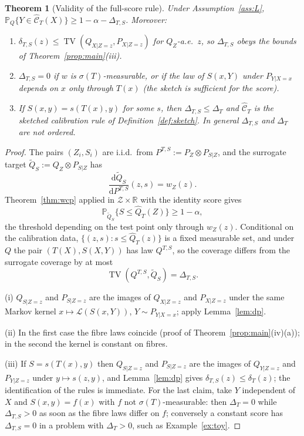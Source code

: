 \documentclass[11pt,a4paper]{article}
\newcommand{\Prob}{\mathbb{P}}
\newcommand{\R}{\mathbb{R}}
\newcommand{\TV}{\operatorname{TV}}
\newcommand{\Cset}{\widehat{\mathcal C}}
\newcommand{\Zc}{\mathcal Z}
\newcommand{\Qt}{\widetilde Q}
\theoremstyle{plain}
\newtheorem{theorem}{Theorem}[section]
\theoremstyle{definition}
\theoremstyle{remark}
\begin{document}
\begin{theorem}[Validity of the full-score rule]\label{thm:fullscore}
Under Assumption~\ref{ass:L}, $\Prob_Q\{Y\in\Cset_T(X)\}\ge1-\alpha-\Delta_{T,S}$. Moreover:
\begin{enumerate}[leftmargin=1.8em,itemsep=1pt]
\item[(i)] $\delta_{T,S}(z)\le\TV(Q_{X|Z=z},P_{X|Z=z})$ for $Q_Z$-a.e.\ $z$, so $\Delta_{T,S}$ obeys the bounds of Theorem~\ref{prop:main}(iii).
\item[(ii)] $\Delta_{T,S}=0$ if $w$ is $\sigma(T)$-measurable, or if the law of $S(x,Y)$ under $P_{Y|X=x}$ depends on $x$ only through $T(x)$ (the sketch is \emph{sufficient for the score}).
\item[(iii)] If $S(x,y)=s(T(x),y)$ for some $s$, then $\Delta_{T,S}\le\Delta_T$ and $\Cset_T$ is the sketched calibration rule of Definition~\ref{def:sketch}. In general $\Delta_{T,S}$ and $\Delta_T$ are not ordered.
\end{enumerate}
\end{theorem}
\begin{proof}
The pairs $(Z_i,S_i)$ are i.i.d.\ from $P^{T,S}:=P_Z\otimes P_{S|Z}$, and the surrogate target $\Qt_S:=Q_Z\otimes P_{S|Z}$ has
\[
\frac{\mathrm d\Qt_S}{\mathrm dP^{T,S}}(z,s)=w_Z(z).
\]
Theorem~\ref{thm:wcp} applied in $\Zc\times\R$ with the identity score gives
\[
\Prob_{\Qt_S}\bigl\{S\le\widehat Q_T(Z)\bigr\}\ge1-\alpha,
\]
the threshold depending on the test point only through $w_Z(z)$. Conditional on the calibration data, $\{(z,s):s\le\widehat Q_T(z)\}$ is a fixed measurable set, and under $Q$ the pair $(T(X),S(X,Y))$ has law $Q^{T,S}$, so the coverage differs from the surrogate coverage by at most
\[
\TV(Q^{T,S},\Qt_S)=\Delta_{T,S}.
\]

(i) $Q_{S|Z=z}$ and $P_{S|Z=z}$ are the images of $Q_{X|Z=z}$ and $P_{X|Z=z}$ under the same Markov kernel $x\mapsto\mathcal L(S(x,Y))$, $Y\sim P_{Y|X=x}$; apply Lemma~\ref{lem:dp}.

(ii) In the first case the fibre laws coincide (proof of Theorem~\ref{prop:main}(iv)(a)); in the second the kernel is constant on fibres.

(iii) If $S=s(T(x),y)$ then $Q_{S|Z=z}$ and $P_{S|Z=z}$ are the images of $Q_{Y|Z=z}$ and $P_{Y|Z=z}$ under $y\mapsto s(z,y)$, and Lemma~\ref{lem:dp} gives $\delta_{T,S}(z)\le\delta_T(z)$; the identification of the rules is immediate. For the last claim, take $Y$ independent of $X$ and $S(x,y)=f(x)$ with $f$ not $\sigma(T)$-measurable: then $\Delta_T=0$ while $\Delta_{T,S}>0$ as soon as the fibre laws differ on $f$; conversely a constant score has $\Delta_{T,S}=0$ in a problem with $\Delta_T>0$, such as Example~\ref{ex:toy}.
\end{proof}
\end{document}
